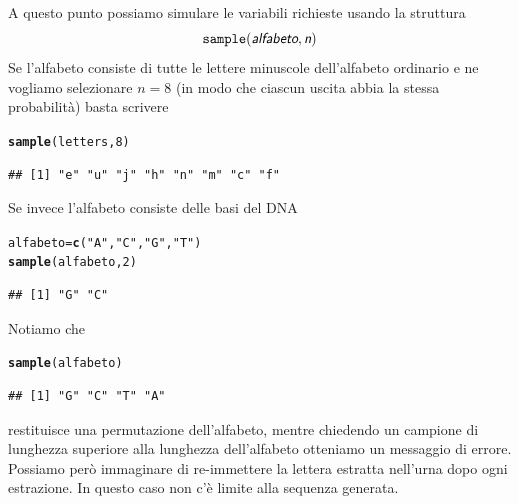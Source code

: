 \documentclass[onecolumn,12pt]{book}\usepackage[]{graphicx}\usepackage[]{color}
\makeatletter
\newcommand{\hlnum}[1]{\textcolor[rgb]{0.686,0.059,0.569}{#1}}%
\newcommand{\hlstr}[1]{\textcolor[rgb]{0.192,0.494,0.8}{#1}}%
\newcommand{\hlstd}[1]{\textcolor[rgb]{0.345,0.345,0.345}{#1}}%
\newcommand{\hlkwb}[1]{\textcolor[rgb]{0.69,0.353,0.396}{#1}}%
\newcommand{\hlkwd}[1]{\textcolor[rgb]{0.737,0.353,0.396}{\textbf{#1}}}%
\newenvironment{kframe}{%
 \def\at@end@of@kframe{}%
 \ifinner\ifhmode%
  \def\at@end@of@kframe{\end{minipage}}%
  \begin{minipage}{\columnwidth}%
 \fi\fi%
 \def\FrameCommand##1{\hskip\@totalleftmargin \hskip-\fboxsep
 \colorbox{shadecolor}{##1}\hskip-\fboxsep
     \hskip-\linewidth \hskip-\@totalleftmargin \hskip\columnwidth}%
 \MakeFramed {\advance\hsize-\width
   \@totalleftmargin\z@ \linewidth\hsize
   \@setminipage}}%
 {\par\unskip\endMakeFramed%
 \at@end@of@kframe}
\newenvironment{knitrout}{}{} %
\newcommand{\varia}[1]{\textsl{\textsf{#1}}}
\makeatother
\begin{document}
A questo punto possiamo simulare le variabili richieste usando la struttura
\begin{equation}\texttt{sample}(\varia{alfabeto},\varia{n})\end{equation}
Se l'alfabeto consiste di tutte le lettere minuscole dell'alfabeto ordinario e ne vogliamo selezionare $n=8$  (in modo che ciascun uscita abbia la stessa probabilit\`a)  basta scrivere
\begin{knitrout}
\color{fgcolor}\begin{kframe}
\begin{alltt}
\hlkwd{sample}\hlstd{(letters,}\hlnum{8}\hlstd{)}
\end{alltt}
\begin{verbatim}
## [1] "e" "u" "j" "h" "n" "m" "c" "f"
\end{verbatim}
\end{kframe}
\end{knitrout}
Se invece l'alfabeto consiste delle basi del DNA
\begin{knitrout}
\color{fgcolor}\begin{kframe}
\begin{alltt}
\hlstd{alfabeto}\hlkwb{=}\hlkwd{c}\hlstd{(}\hlstr{"A"}\hlstd{,}\hlstr{"C"}\hlstd{,}\hlstr{"G"}\hlstd{,}\hlstr{"T"}\hlstd{)}
\hlkwd{sample}\hlstd{(alfabeto,}\hlnum{2}\hlstd{)}
\end{alltt}
\begin{verbatim}
## [1] "G" "C"
\end{verbatim}
\end{kframe}
\end{knitrout}
Notiamo che
\begin{knitrout}
\color{fgcolor}\begin{kframe}
\begin{alltt}
 \hlkwd{sample}\hlstd{(alfabeto)}
\end{alltt}
\begin{verbatim}
## [1] "G" "C" "T" "A"
\end{verbatim}
\end{kframe}
\end{knitrout}
restituisce una permutazione dell'alfabeto, mentre chiedendo un campione di lunghezza superiore alla lunghezza dell'alfabeto otteniamo un messaggio di errore. Possiamo per\`o immaginare di re-immettere la lettera estratta nell'urna dopo ogni estrazione. In questo caso non c'\`e limite alla sequenza generata.
\end{document}
